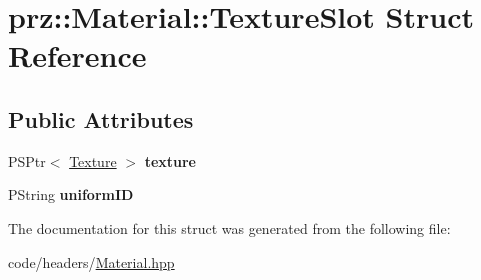 \hypertarget{structprz_1_1_material_1_1_texture_slot}{}\section{prz\+::Material\+::Texture\+Slot Struct Reference}
\label{structprz_1_1_material_1_1_texture_slot}
\subsection*{Public Attributes}
\begin{DoxyCompactItemize}
\item 
\mbox{\label{structprz_1_1_material_1_1_texture_slot_aa721b2df1809c9e7ab639f20aa357ec4}} 
P\+S\+Ptr$<$ \mbox{\hyperlink{classprz_1_1_texture}{Texture}} $>$ {\bfseries texture}
\item 
\mbox{\label{structprz_1_1_material_1_1_texture_slot_aa8cfb7adc3e2a00e24bd3a2e8482fd4c}} 
P\+String {\bfseries uniform\+ID}
\end{DoxyCompactItemize}


The documentation for this struct was generated from the following file\+:\begin{DoxyCompactItemize}
\item 
code/headers/\mbox{\hyperlink{_material_8hpp}{Material.\+hpp}}\end{DoxyCompactItemize}
